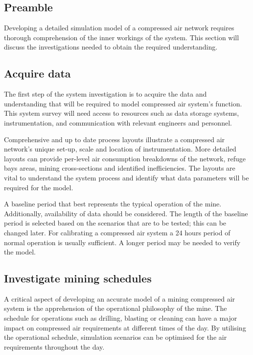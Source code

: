 	\subsection{Preamble}
		Developing a detailed simulation model of a compressed air network requires thorough comprehension of the inner workings of the system. This section will discuss the investigations needed to obtain the required understanding.
	\subsection{Acquire data} %
	The first step of the system investigation is to acquire the data and understanding that will be required to model compressed air system's function. This system survey will need access to resources such as data storage systems, instrumentation, and communication with relevant engineers and personnel.
	\par 
	Comprehensive and up to date process layouts illustrate a compressed air network's unique set-up, scale and location of instrumentation. More detailed layouts can provide per-level air consumption breakdowns of the network, refuge bays areas, mining cross-sections and identified inefficiencies. The layouts are vital to understand the system process and identify what data parameters will be required for the model. 
	\par 
	A baseline period that best represents the typical operation of the mine. Additionally, availability of data should be considered. The length of the baseline period is selected based on the scenarios that are to be tested; this can be changed later. For calibrating a compressed air system a 24 hours period of normal operation is usually sufficient. A longer period may be needed to verify the model. 

	\subsection{Investigate mining schedules}
	A critical aspect of developing an accurate model of a mining compressed air system is the apprehension of the operational philosophy of the mine. The schedule for operations such as drilling, blasting or cleaning can have a major impact on compressed air requirements at different times of the day. By utilising the operational schedule, simulation scenarios can be optimised for the air requirements throughout the day.	
	
